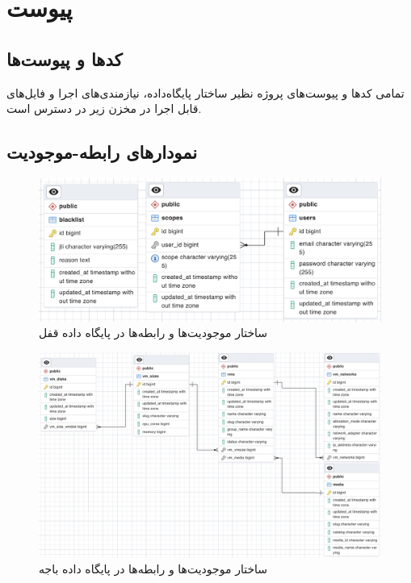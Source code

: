 \chapter*{‌پیوست}


\section*{کد‌ها و پیوست‌ها}
تمامی‌ کد‌ها و پیوست‌های پروژه نظیر ساختار پایگاه‌داده، نیازمندی‌های اجرا و فایل‌های قابل اجرا در مخزن زیر در دسترس است.
\begin{latin}
	\href{https://github.com/smf8/30bird}{}
\end{latin}

\section*{نمودار‌های رابطه-موجودیت}

\begin{figure}
	\centering
	\includegraphics[width=0.9\linewidth]{figures/erd-ghofl}
	\caption{ساختار موجودیت‌ها و رابطه‌ها در پایگاه داده قفل}
	\label{fig:erd-ghofl}
\end{figure}

\begin{figure}
	\centering
	\includegraphics[width=1\linewidth]{figures/erd-baaje}
	\caption{ساختار موجودیت‌ها و رابطه‌ها در پایگاه داده باجه}
	\label{fig:erd-baaje}
\end{figure}

